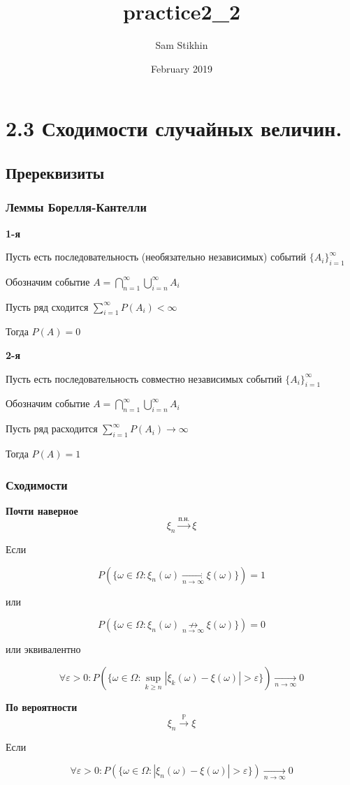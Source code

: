 \documentclass[a4paper, 14pt]{extarticle}
\title{practice2_2}
\author{Sam Stikhin}
\date{February 2019}
\begin{document}
\section*{2.3 Сходимости случайных величин.}
\subsection*{Пререквизиты}
\subsubsection*{Леммы Борелля-Кантелли}
\textbf{1-я}

Пусть есть последовательность (необязательно независимых) событий $\{A_i\}_{i=1}^{\infty}$

Обозначим событие $A = \bigcap_{n=1}^{\infty}\bigcup_{i=n}^{\infty}A_i$

Пусть ряд сходится $\sum_{i=1}^{\infty}P(A_i) < \infty$

Тогда $P(A) = 0$

\textbf{2-я}

Пусть есть последовательность совместно независимых событий $\{A_i\}_{i=1}^{\infty}$

Обозначим событие $A = \bigcap_{n=1}^{\infty}\bigcup_{i=n}^{\infty}A_i$

Пусть ряд расходится $\sum_{i=1}^{\infty}P(A_i) \to \infty$

Тогда $P(A) = 1$
\subsubsection*{Сходимости}
\textbf{Почти наверное}
$$\xi_n \overset{\textrm{п.н.}}{\to} \xi$$

Если

$$P(\{ \omega \in \Omega : \xi_n(\omega) \underset{n \to \infty}{\to} \xi(\omega) \}) = 1$$ 

или

$$P(\{ \omega \in \Omega : \xi_n(\omega) \underset{n \to \infty}{\not\to} \xi(\omega) \}) = 0$$ 

или эквивалентно

$$\forall \varepsilon > 0 : P(\{ \omega \in \Omega : \sup_{k \geq n} |\xi_k(\omega)-\xi(\omega)| > \varepsilon \}) \underset{n \to \infty}{\to} 0$$

\textbf{По вероятности}
$$\xi_n \overset{\mathbb{P}}{\to} \xi$$ 

Если

$$\forall \varepsilon > 0 : P(\{\omega \in \Omega : |\xi_n(\omega)-\xi(\omega)| > \varepsilon \}) \underset{n \to \infty}{\to} 0$$
\end{document}
